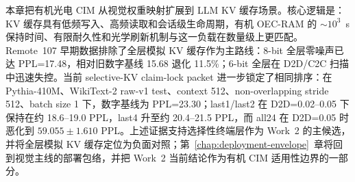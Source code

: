 本章把有机光电 CIM 从视觉权重映射扩展到 LLM KV 缓存场景。核心逻辑是：KV 缓存具有低频写入、高频读取和会话级生命周期，有机 OEC-RAM 的 $\sim10^3$~s 保持时间、有限耐久性和光学刷新机制与这一负载在数量级上更匹配。Remote~107 早期数据排除了全层模拟 KV 缓存作为主路线：8-bit 全层零噪声已达 PPL=17.48，相对旧数字基线 15.68 退化 11.5\%；6-bit 全层在 D2D/C2C 扫描中迅速失控。当前 selective-KV claim-lock packet 进一步锁定了相同排序：在 Pythia-410M、WikiText-2 raw-v1 test、context 512、non-overlapping stride 512、batch size 1 下，数字基线为 PPL=23.30；last1/last2 在 D2D=0.02--0.05 下保持在约 18.6--19.0 PPL，last4 升至约 20.4--21.5 PPL，而 all24 在 D2D=0.05 时恶化到 $59.055\pm1.610$ PPL。上述证据支持选择性终端层作为 Work~2 的主候选，并将全层模拟 KV 缓存定位为负面对照；第~\ref{chap:deployment-envelope}~章将回到视觉主线的部署包络，并把 Work~2 当前结论作为有机 CIM 适用性边界的一部分。
